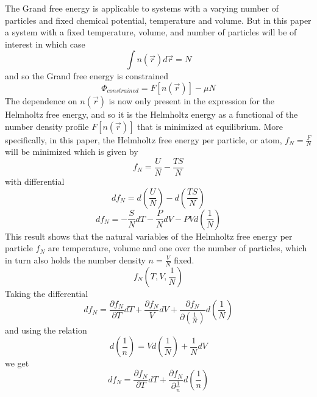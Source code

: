 \documentclass[double,12pt]{beavtex}
\begin{document}
The Grand free energy is applicable to systems with a varying number of 
particles and fixed chemical potential, temperature and volume. But in 
this paper a system with a fixed temperature, volume, and number of 
particles will be of interest in which case
\begin{equation}\int n(\vec r)d\vec{r}=N\end{equation}
and so the Grand free energy is constrained
\begin{equation}\label{GrandFE}\Phi_{constrained}= F[n(\vec r)]-\mu N\end{equation}
The dependence on $n(\vec r)$ is now only present in the expression for 
the Helmholtz free energy, and so it is the Helmholtz energy as a functional 
of the number density profile $F[n(\vec r)]$ that is minimized at equilibrium. 
More specifically, in this paper, the Helmholtz free energy per particle, 
or atom,  $f_N=\frac{F}{N}$ will be minimized which is given by
\begin{equation}f_N=\frac{U}{N}-\frac{TS}{N}\end{equation}
with differential
\begin{equation}\label{usetoshowmin}df_N=d\left(\frac{U}{N}\right)-d\left(\frac{TS}{N}\right)\end{equation}
\begin{equation}df_N=-\frac{S}{N}dT-\frac{P}{N}dV-PVd\left(\frac{1}{N}\right)\end{equation}
This result shows that the natural variables of the Helmholtz free energy 
per particle $f_N$ are temperature, volume and one over the number of 
particles, which in turn also holds the number density $n=\frac{V}{N}$ fixed. 
\begin{equation}f_N(T,V, \frac{1}{N})\end{equation}
Taking the differential
\begin{displaymath}df_N=\frac{\partial f_N}{\partial T}dT +\frac{\partial f_N}{V}dV+ \frac{\partial f_N}{\partial \left(\frac{1}{N}\right)}d\left(\frac{1}{N}\right)\end{displaymath}
and using the relation
\begin{displaymath}d\left(\frac{1}{n}\right)=Vd\left(\frac{1}{N}\right)+\frac{1}{N}dV\end{displaymath}
we get
\begin{displaymath}df_N=\frac{\partial f_N}{\partial T}dT + \frac{\partial f_N}{\partial \frac{1}{n}}d\left(\frac{1}{n}\right)\end{displaymath}
\end{document}
